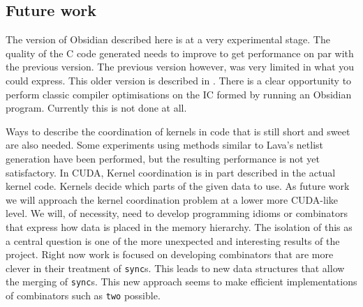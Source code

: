 \subsection{Future work} \label{sec:fut}

The version of Obsidian described here is at a very experimental stage. 
The quality of the C code generated needs to improve to get performance 
on par with the previous version. The previous version however, was very
limited in what you could express. This older version is described in
.
There is a clear opportunity to perform classic compiler optimisations on 
the IC formed by running an Obsidian program. Currently this is not done at all. 

Ways to describe the coordination 
of kernels in code that is still short and sweet are also needed. Some experiments using 
methods similar to Lava's netlist generation have been performed, but the
resulting performance is not yet satisfactory. In CUDA, Kernel coordination 
is in part described in the actual kernel code. Kernels decide which parts 
of the given data to use. As future work we will approach the kernel 
coordination problem at a lower more CUDA-like level. We will, of necessity,
need to develop programming idioms or combinators that express how data is 
placed in the memory hierarchy. The isolation of this as a central question 
is one of the more unexpected and interesting results of the project.
Right now work is focused on developing combinators that are more clever 
in their treatment of {\tt sync}s. This leads to new data structures that 
allow the merging of {\tt sync}s. This new approach seems to make efficient
implementations of combinators such as {\tt two} possible. 



